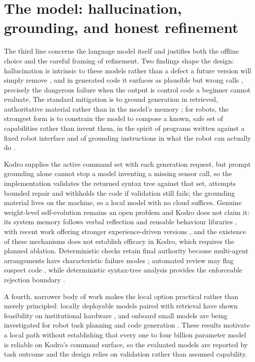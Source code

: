 \documentclass[11pt,a4paper]{report}
\begin{document}
\section{The model: hallucination, grounding, and honest refinement}
 The third line concerns the language model itself and justifies both the offline choice and the careful framing of refinement. Two findings shape the design: hallucination is intrinsic to these models rather than a defect a future version will simply remove \citep{huang2025}, and in generated code it surfaces as plausible but wrong calls \citep{lee2025}, precisely the dangerous failure when the output is control code a beginner cannot evaluate. The standard mitigation is to ground generation in retrieved, authoritative material rather than in the model's memory \citep{lewis2020}; for robots, the strongest form is to constrain the model to compose a known, safe set of capabilities rather than invent them, in the spirit of programs written against a fixed robot interface \citep{liang2023,dossantos2026} and of grounding instructions in what the robot can actually do \citep{ahn2022}.

 Kodro supplies the active command set with each generation request, but prompt grounding alone cannot stop a model inventing a missing sensor call, so the implementation validates the returned syntax tree against that set, attempts bounded repair and withholds the code if validation still fails; the grounding material lives on the machine, so a local model with no cloud suffices. Genuine weight-level self-evolution remains an open problem \citep{tao2024} and Kodro does not claim it: its system memory follows verbal reflection \citep{shinn2023} and reusable behaviour libraries \citep{wang2023}, with recent work offering stronger experience-driven versions \citep{wu2025}, and the existence of these mechanisms does not establish efficacy in Kodro, which requires the planned ablation. Deterministic checks retain final authority because multi-agent arrangements have characteristic failure modes \citep{cemri2025}; automated review may flag suspect code \citep{sun2025}, while deterministic syntax-tree analysis provides the enforceable rejection boundary \citep{khati2026}.

A fourth, narrower body of work makes the local option practical rather than merely principled: locally deployable models paired with retrieval have shown feasibility on institutional hardware \citep{reza2025}, and onboard small models are being investigated for robot task planning and code generation \citep{wang2026}. These results motivate a local path without establishing that every one to four billion parameter model is reliable on Kodro's command surface, so the evaluated models are reported by task outcome and the design relies on validation rather than assumed capability.
\end{document}
